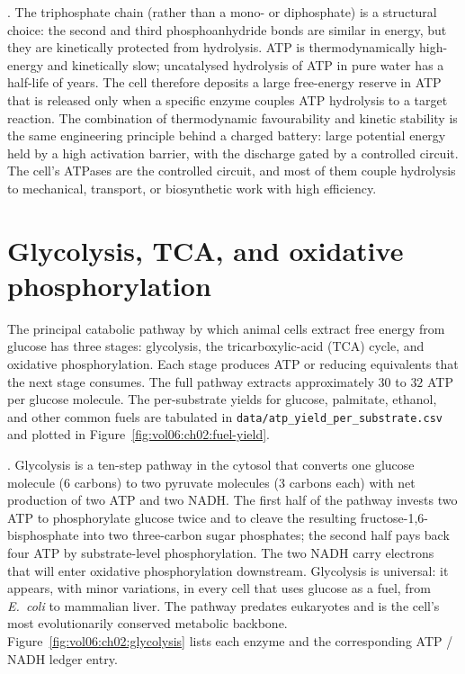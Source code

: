 . The triphosphate
chain (rather than a mono- or diphosphate) is a structural choice:
the second and third phosphoanhydride bonds are similar in energy,
but they are kinetically protected from hydrolysis. ATP is
thermodynamically high-energy and kinetically slow; uncatalysed
hydrolysis of ATP in pure water has a half-life of years. The cell
therefore deposits a large free-energy reserve in ATP that is
released only when a specific enzyme couples ATP hydrolysis to a
target reaction. The combination of thermodynamic favourability and
kinetic stability is the same engineering principle behind a
charged battery: large potential energy held by a high activation
barrier, with the discharge gated by a controlled circuit. The cell's
ATPases are the controlled circuit, and most of them couple hydrolysis
to mechanical, transport, or biosynthetic work with high efficiency.

\section{Glycolysis, TCA, and oxidative phosphorylation}

The principal catabolic pathway by which animal cells extract free
energy from glucose has three stages: glycolysis, the
tricarboxylic-acid (TCA) cycle, and oxidative phosphorylation. Each
stage produces ATP or reducing equivalents that the next stage
consumes. The full pathway extracts approximately $30$ to $32$ ATP
per glucose molecule. The per-substrate yields for glucose, palmitate,
ethanol, and other common fuels are tabulated in
\texttt{data/atp\_yield\_per\_substrate.csv} and plotted in
Figure~\ref{fig:vol06:ch02:fuel-yield}.

. Glycolysis is a ten-step pathway in the cytosol
that converts one glucose molecule (6 carbons) to two pyruvate
molecules (3 carbons each) with net production of two ATP and two
NADH. The first half of the pathway invests two ATP to phosphorylate
glucose twice and to cleave the resulting fructose-1,6-bisphosphate
into two three-carbon sugar phosphates; the second half pays back
four ATP by substrate-level phosphorylation. The two NADH carry
electrons that will enter oxidative phosphorylation downstream.
Glycolysis is universal: it appears, with minor variations, in
every cell that uses glucose as a fuel, from \emph{E.~coli} to
mammalian liver. The pathway predates eukaryotes and is the cell's
most evolutionarily conserved metabolic backbone.
Figure~\ref{fig:vol06:ch02:glycolysis} lists each enzyme and the
corresponding ATP / NADH ledger entry.

